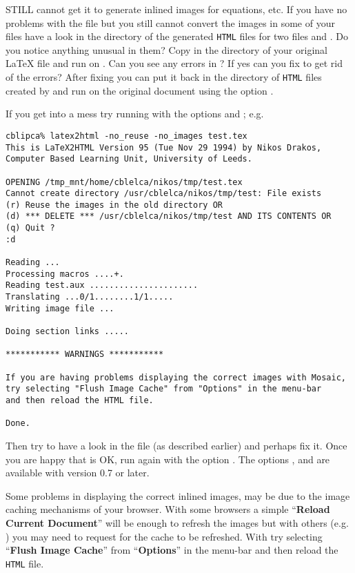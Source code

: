 \begin{htmllist}
\item [STILL cannot get it to generate inlined images for equations, etc. ]
If you have no problems with the  file but you
still cannot convert the images in some of your files 
have a look in the directory of the generated
\texttt{HTML} files for two files  and . Do you notice
anything unusual in them? Copy  in the directory 
of your original \LaTeX{} file and run  on .
Can you see any errors in ? If yes can you fix
 to get rid of the errors? 
After fixing 
you can put it back in the directory of \texttt{HTML} files created by
\latextohtml{} and run \latextohtml{} on the original document 
using the option . 

If you get into a mess try running \latextohtml{} with the options
 and ; e.g.
\begin{small}
\begin{verbatim}
cblipca% latex2html -no_reuse -no_images test.tex
This is LaTeX2HTML Version 95 (Tue Nov 29 1994) by Nikos Drakos, 
Computer Based Learning Unit, University of Leeds.

OPENING /tmp_mnt/home/cblelca/nikos/tmp/test.tex 
Cannot create directory /usr/cblelca/nikos/tmp/test: File exists
(r) Reuse the images in the old directory OR
(d) *** DELETE *** /usr/cblelca/nikos/tmp/test AND ITS CONTENTS OR
(q) Quit ?
:d

Reading ...
Processing macros ....+.
Reading test.aux ......................
Translating ...0/1........1/1.....
Writing image file ...

Doing section links .....

*********** WARNINGS ***********

If you are having problems displaying the correct images with Mosaic,
try selecting "Flush Image Cache" from "Options" in the menu-bar 
and then reload the HTML file.

Done.
\end{verbatim}
\end{small}
Then try to have a look in the file   
(as described earlier) and perhaps fix it.
Once you are happy that  is OK, run \latextohtml{}
again with the option .
The options ,  and 
are available with \latextohtml{} version 0.7 or later.

Some problems in displaying the correct inlined images,
may be due to the image caching mechanisms of your browser.
With some browsers a simple ``\textbf{Reload Current Document}'' will be enough
to refresh the images but with others (e.g. ) you may need
to request for the cache to be refreshed. With  try 
selecting ``\textbf{Flush Image Cache}'' from ``\textbf{Options}'' in the menu-bar 
and then reload the \texttt{HTML} file.



\end{htmllist}
